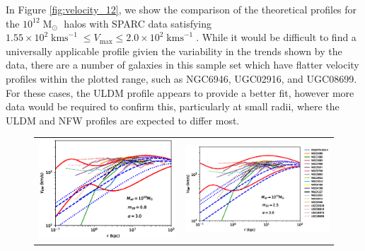 \documentclass[a4paper,11pt]{article}
\begin{document}
In Figure \ref{fig:velocity_12}, we show the comparison of the theoretical profiles for the $10^{12}\operatorname{M}_{\odot}$ halos with SPARC data satisfying $1.55 \times 10^2 \operatorname{kms}^{-1}\leq V_{\mathrm{max}}\leq 2.0 \times 10^2 \operatorname{kms}^{-1}$. While it would be difficult to find a universally applicable profile givien the variability in the trends shown by the data, there are a number of galaxies in this sample set which have flatter velocity profiles within the plotted range, such as NGC6946, UGC02916, and UGC08699. For these cases, the ULDM profile appears to provide a better fit, however more  data would be required to confirm this, particularly at small radii, where the ULDM and NFW profiles are expected to differ most.

\begin{figure}
\begin{tabular}{cc}
{\includegraphics[scale = 0.65, trim={2.5cm 2.5cm 2.1cm 0.1cm}]{pics/v_12_8_3.eps}} &
{\includegraphics[scale = 0.65, trim={2.1cm 2.5cm 0cm 0.1cm}]{pics/v_12_25_3.eps}}

\end{tabular}
\end{figure}
\end{document}
